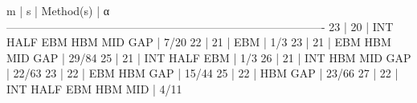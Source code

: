   m    |   s    |                   Method(s)                  |        α         
-------------------------------------------------------------------------------------   
23    |  20    |        INT  HALF  EBM  HBM  MID  GAP         | 7/20   
22    |  21    |                   EBM                        | 1/3   
23    |  21    |                   EBM  HBM  MID  GAP         | 29/84   
25    |  21    |        INT  HALF  EBM                        | 1/3   
26    |  21    |        INT             HBM  MID  GAP         | 22/63   
23    |  22    |                   EBM  HBM       GAP         | 15/44   
25    |  22    |                        HBM       GAP         | 23/66   
27    |  22    |        INT  HALF  EBM  HBM  MID              | 4/11